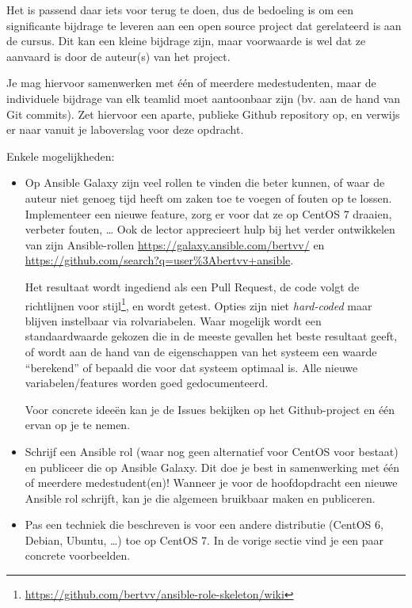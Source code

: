 Het is passend daar iets voor terug te doen, dus de bedoeling is om een significante bijdrage te leveren aan een open source project dat gerelateerd is aan de cursus. Dit kan een kleine bijdrage zijn, maar voorwaarde is wel dat ze aanvaard is door de auteur(s) van het project.

Je mag hiervoor samenwerken met één of meerdere medestudenten, maar de individuele bijdrage van elk teamlid moet aantoonbaar zijn (bv. aan de hand van Git commits). Zet hiervoor een aparte, publieke Github repository op, en verwijs er naar vanuit je laboverslag voor deze opdracht.

Enkele mogelijkheden:

\begin{itemize}
  \item Op Ansible Galaxy zijn veel rollen te vinden die beter kunnen, of waar de auteur niet genoeg tijd heeft om zaken toe te voegen of fouten op te lossen. Implementeer een nieuwe feature, zorg er voor dat ze op CentOS 7 draaien, verbeter fouten, \ldots{} Ook de lector apprecieert hulp bij het verder ontwikkelen van zijn Ansible-rollen \url{https://galaxy.ansible.com/bertvv/} en \url{https://github.com/search?q=user\%3Abertvv+ansible}.

  Het resultaat wordt ingediend als een Pull Request, de code volgt de richtlijnen voor stijl\footnote{\url{https://github.com/bertvv/ansible-role-skeleton/wiki}}, en wordt getest. Opties zijn niet \emph{hard-coded} maar blijven instelbaar via rolvariabelen. Waar mogelijk wordt een standaardwaarde gekozen die in de meeste gevallen het beste resultaat geeft, of wordt aan de hand van de eigenschappen van het systeem een waarde ``berekend'' of bepaald die voor dat systeem optimaal is. Alle nieuwe variabelen/features worden goed gedocumenteerd.
  
  Voor concrete ideeën kan je de Issues bekijken op het Github-project en één ervan op je te nemen.

  \item Schrijf een Ansible rol (waar nog geen alternatief voor CentOS voor bestaat) en publiceer die op Ansible Galaxy. Dit doe je best in samenwerking met één of meerdere medestudent(en)! Wanneer je voor de hoofdopdracht een nieuwe Ansible rol schrijft, kan je die algemeen bruikbaar maken en publiceren.
  
  \item Pas een techniek die beschreven is voor een andere distributie (CentOS 6, Debian, Ubuntu, \ldots{}) toe op CentOS 7. In de vorige sectie vind je een paar concrete voorbeelden.
\end{itemize}

